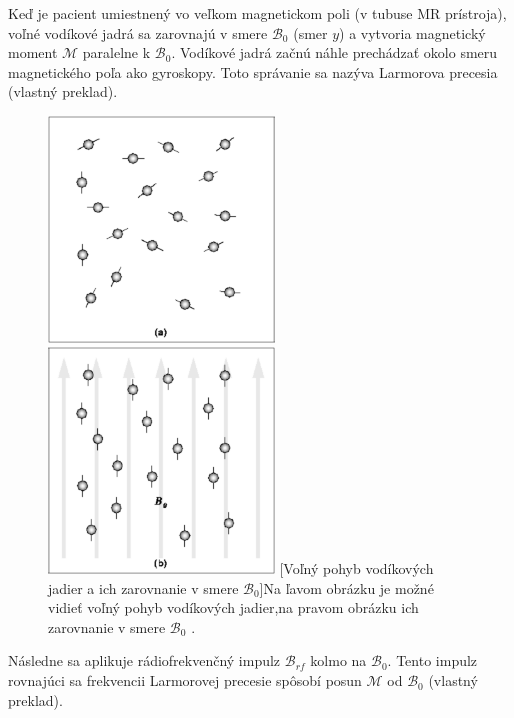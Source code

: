 Keď je pacient umiestnený vo veľkom magnetickom poli (v tubuse MR prístroja), voľné vodíkové jadrá sa zarovnajú v smere $\mathcal{B}_{0}$ (smer $y$) a vytvoria magnetický moment $\mathcal{M}$ paralelne k $\mathcal{B}_{0}$. Vodíkové jadrá začnú náhle prechádzať okolo smeru magnetického poľa ako gyroskopy. Toto správanie sa nazýva Larmorova precesia \cite{basic_principles_of_mri} (vlastný preklad).

\begin {figure}[H]
        \centering
        \includegraphics[height=6cm]{media/hydrogen/hydrogen_moving_freely.png}
        \includegraphics[height=6cm]{media/hydrogen/hydrogen_oscilating.png}
        \captionsetup{justification=centering}
        [Voľný pohyb vodíkových jadier a ich zarovnanie v smere $\mathcal{B}_{0}$]{Na ľavom obrázku je možné vidieť voľný pohyb vodíkových jadier,\newline na pravom obrázku ich zarovnanie v smere $\mathcal{B}_{0}$ \cite{basic_principles_of_mri}.}
\end {figure}

Následne sa aplikuje rádiofrekvenčný impulz $\mathcal{B}_{rf}$ kolmo na $\mathcal{B}_{0}$. \newline
Tento impulz rovnajúci sa frekvencii Larmorovej precesie spôsobí posun \newline $\mathcal{M}$ od $\mathcal{B}_{0}$ \cite{basic_principles_of_mri} (vlastný preklad).

